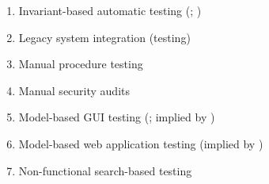 \begin{enumerate}
    \item Invariant-based automatic testing (\citealp[pp.~184\==185, Tab.~21]{DoğanEtAl2014};
          \citealp{MesbahAndVanDeursen2009})
    \item Legacy system integration (testing) \citep[Tab.~2]{Gerrard2000a}
    \item Manual procedure testing \citep[p.~47]{Firesmith2015}
    \item Manual security audits \citep[p.~28]{Gerrard2000b}
    \item Model-based GUI testing (\citealp[Tab.~1]{DoğanEtAl2014}; implied by \citealp[p.~356]{SakamotoEtAl2013})
    \item Model-based web application testing (implied by \citealp[p.~356]{SakamotoEtAl2013})
    \item Non-functional search-based testing \citep[Tab.~1]{DoğanEtAl2014}

\end{enumerate}
